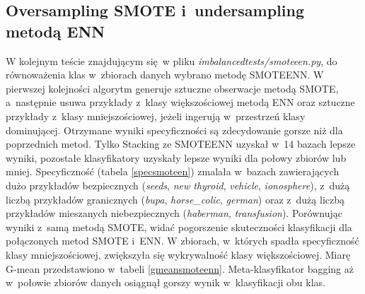 \subsection{Oversampling SMOTE i~undersampling metodą ENN}
W kolejnym teście znajdującym się w pliku \textit{imbalancedtests/smoteeen.py}, do równoważenia klas w~zbiorach danych wybrano metodę SMOTEENN. W pierwszej kolejności algorytm generuje sztuczne obserwacje metodą SMOTE, a~następnie usuwa przykłady z~klasy większościowej metodą ENN oraz sztuczne przykłady z~klasy mniejszościowej, jeżeli ingerują w~przestrzeń klasy dominującej. Otrzymane wyniki specyficzności są zdecydowanie gorsze niż dla poprzednich metod. Tylko Stacking ze SMOTEENN uzyskał w~14 bazach lepsze wyniki, pozostałe klasyfikatory uzyskały lepsze wyniki dla połowy zbiorów lub mniej. Specyficzność (tabela \ref{specsmoteen}) zmalała w~bazach zawierających dużo przykładów bezpiecznych (\textit{seeds}, \textit{new thyroid}, \textit{vehicle}, \textit{ionosphere}), z~dużą liczbą przykładów granicznych (\textit{bupa}, \textit{horse\_colic}, \textit{german}) oraz z~dużą liczbą przykładów mieszanych niebezpiecznych (\textit{haberman}, \textit{transfusion}). Porównując wyniki z~samą metodą SMOTE, widać pogorszenie skuteczności klasyfikacji dla połączonych metod SMOTE i~ENN.
W zbiorach, w~których spadła specyficzność klasy mniejszościowej, zwiększyła się wykrywalność klasy większościowej. Miarę G-mean przedstawiono w~tabeli \ref{gmeansmoteenn}. Meta-klasyfikator bagging aż w~połowie zbiorów danych osiągnął gorszy wynik w~klasyfikacji obu klas.
